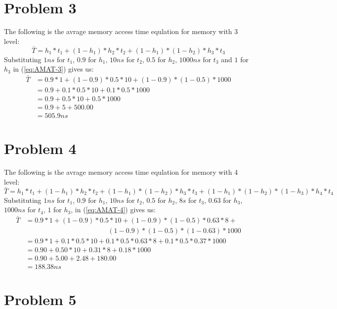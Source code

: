 \documentclass[11pt]{article}
\begin{document}
\section{Problem 3}
The following is the avrage memory access time equlation for
memory with 3 level:
\begin{equation}
	\label{eq:AMAT-3}
	\bar{T} = h_1 * t_1 + (1 - h_1) * h_2 * t_2 + (1 - h_1) * (1 - h_2) * h_3 * t_3
\end{equation}
Substituting $1ns$ for $t_1$, $0.9$ for $h_1$, $10ns$ for $t_2$, $0.5$ for $h_2$, $1000ns$ for $t_3$ and $1$ for $h_3$
in (\ref{eq:AMAT-3}) gives us:
\begin{align*}
	\bar{T} &= 0.9 * 1 + (1 - 0.9) * 0.5 * 10 + (1 - 0.9) * (1 - 0.5) * 1000\\
	&= 0.9 + 0.1 * 0.5 * 10 + 0.1 * 0.5 * 1000\\
	&= 0.9 + 0.5 * 10 + 0.5 * 1000\\
	&= 0.9 + 5 + 500.00\\
	&= 505.9ns
\end{align*}
\section{Problem 4}
The following is the avrage memory access time equlation for
memory with 4 level:
\begin{equation}
	\label{eq:AMAT-4}
	\bar{T} = h_1 * t_1 + (1 - h_1) * h_2 * t_2 + (1 - h_1) * (1 - h_2) * h_3 * t_3 + (1 - h_1) * (1 - h_2) * (1 - h_3) * h_4 * t_4
\end{equation}
Substituting $1ns$ for $t_1$, $0.9$ for $h_1$, $10ns$ for $t_2$, $0.5$ for $h_2$, $8s$ for $t_3$, $0.63$ for $h_3$,$1000ns$ for $t_4$, $1$ for $h_3$,
in (\ref{eq:AMAT-4}) gives us:
\begin{align*}
	\bar{T} &= 0.9 * 1 + (1 - 0.9) * 0.5 * 10 + (1 - 0.9) * (1 - 0.5) * 0.63 * 8 + \\
	&\qquad \phantom{= 0.1 * 1 + (1 - 0.9)} (1 - 0.9) * (1 - 0.5) * (1 - 0.63) * 1000 \\
	&= 0.9 * 1 + 0.1 * 0.5 * 10 + 0.1 * 0.5 * 0.63 * 8 + 0.1 * 0.5 * 0.37 * 1000 \\
	&= 0.90 + 0.50 * 10 + 0.31 * 8 + 0.18 * 1000 \\
	&= 0.90 + 5.00 + 2.48 + 180.00 \\
	&= 188.38ns
\end{align*}
\section{Problem 5}
\end{document}

